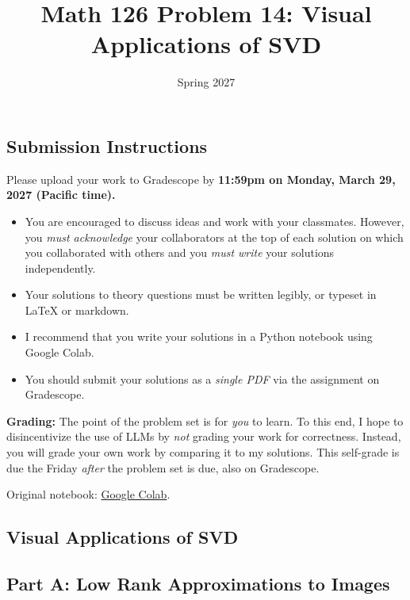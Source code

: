 \documentclass{article}
\title{Math 126 Problem 14: Visual Applications of SVD}
\author{} %
\date{Spring 2027}
\begin{document}
\maketitle

\hypertarget{submission-instructions}{%
\subsection*{Submission Instructions}\label{submission-instructions}}

Please upload your work to Gradescope by \textbf{11:59pm on Monday, March 29, 2027 (Pacific time).}

\begin{itemize}
\item
  You are encouraged to discuss ideas and work with your classmates. However, you \emph{must acknowledge} your collaborators at the top of each solution on which you collaborated with others and you \emph{must write} your solutions independently.
\item
  Your solutions to theory questions must be written legibly, or typeset in LaTeX or markdown.
\item
  I recommend that you write your solutions in a Python notebook using Google Colab.
\item
  You should submit your solutions as a \emph{single PDF} via the assignment on Gradescope.
\end{itemize}

\textbf{Grading:} The point of the problem set is for \emph{you} to learn. To this end, I hope to disincentivize the use of LLMs by \emph{not} grading your work for correctness. Instead, you will grade your own work by comparing it to my solutions. This self-grade is due the Friday \emph{after} the problem set is due, also on Gradescope.

\noindent Original notebook: \href{https://colab.research.google.com/drive/131XUvWaOZQLDnd_PZGU1o8yenD8XoOgP?usp=sharing}{Google Colab}.

\hypertarget{visual-applications-of-svd}{%
\subsection*{Visual Applications of SVD}\label{visual-applications-of-svd}}

\hypertarget{part-a-low-rank-approximations-to-images}{%
\subsection*{Part A: Low Rank Approximations to Images}\label{part-a-low-rank-approximations-to-images}}
\end{document}
